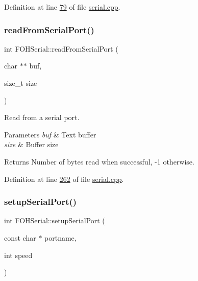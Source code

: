 Definition at line \mbox{\hyperlink{serial_8cpp_source_l00079}{79}} of file \mbox{\hyperlink{serial_8cpp_source}{serial.\+cpp}}.

\mbox{\label{classFOHSerial_a569186c2a1975065f16c473f79f804c4}} 
\subsubsection{\texorpdfstring{read\+From\+Serial\+Port()}{readFromSerialPort()}}
{\footnotesize\ttfamily int F\+O\+H\+Serial\+::read\+From\+Serial\+Port (\begin{DoxyParamCaption}\item[{char $\ast$$\ast$}]{buf,  }\item[{size\+\_\+t}]{size }\end{DoxyParamCaption})}



Read from a serial port. 


\begin{DoxyParams}{Parameters}
{\em buf} & Text buffer \\
\hline
{\em size} & Buffer size\\
\hline
\end{DoxyParams}
\begin{DoxyReturn}{Returns}
Number of bytes read when successful, -\/1 otherwise. 
\end{DoxyReturn}


Definition at line \mbox{\hyperlink{serial_8cpp_source_l00262}{262}} of file \mbox{\hyperlink{serial_8cpp_source}{serial.\+cpp}}.

\mbox{\label{classFOHSerial_ad76591cc93c0abea4acdbc3ebb47435b}} 
\subsubsection{\texorpdfstring{setup\+Serial\+Port()}{setupSerialPort()}}
{\footnotesize\ttfamily int F\+O\+H\+Serial\+::setup\+Serial\+Port (\begin{DoxyParamCaption}\item[{const char $\ast$}]{portname,  }\item[{int}]{speed }\end{DoxyParamCaption})}



